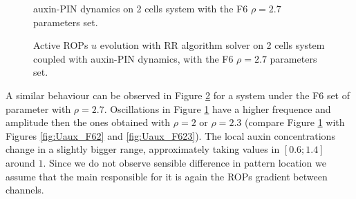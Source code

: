 \begin{figure}[p]
    \centering
    \quad
    \caption[auxin-PIN - with the F6 $\rho = 2.7$ set]{auxin-PIN dynamics on 2 cells system with the F6 $\rho = 2.7$ parameters set.}
    \label{fig:Uaux_F627}
\end{figure}
\begin{figure}[hp]
    \centering
    \quad
    \quad
    \quad
    \quad
    \quad
    \quad
    \quad
    \quad
    \caption[2cell RR Active ROPs coupled auxin-PIN - with the F6 $\rho = 2.7$ set]{Active ROPs $u$ evolution with RR algorithm solver on 2 cells system coupled with auxin-PIN dynamics, with the F6 $\rho = 2.7$ parameters set.}
    \label{fig:U_F627}
\end{figure}


A similar behaviour can be observed  in Figure \ref{fig:U_F627} for a system under the F6 set of parameter with $\rho = 2.7$. Oscillations in Figure \ref{fig:Uaux_F627} have a higher frequence and amplitude then the ones obtained with $\rho = 2 $ or $\rho = 2.3 $ (compare Figure \ref{fig:Uaux_F627} with Figures \ref{fig:Uaux_F62} and \ref{fig:Uaux_F623}). The local auxin concentrations change in a slightly bigger range, approximately taking values in $\left[0.6; 1.4\right]$ around $1$. Since we do not observe sensible difference in pattern location we assume that the main responsible for it is again the ROPs gradient between channels.

